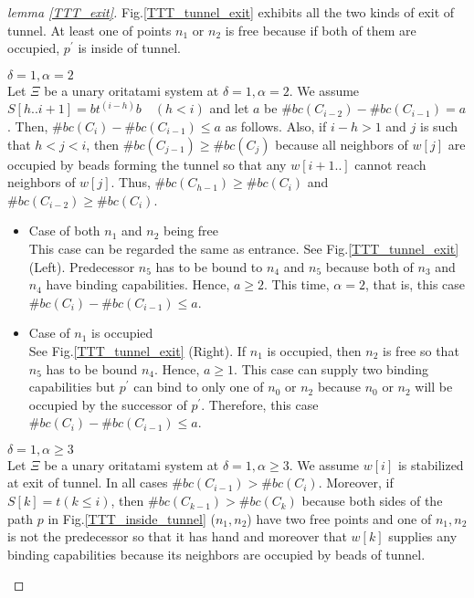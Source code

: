 \documentclass[runningheads]{llncs}
\begin{document}
\begin{proof}[lemma \ref{TTT_exit}]
Fig.\ref{TTT_tunnel_exit} exhibits all the two kinds of exit of tunnel. 
At least one of points $n_1$ or $n_2$ is free because if both of them are occupied, $p^\prime$ is inside of tunnel.

\begin{paragraph}{}
$\delta = 1, \alpha = 2$\\
Let $\Xi$ be a unary oritatami system at $\delta = 1, \alpha = 2$. We assume $S[h..i+1] = bt^{(i-h)}b \quad (h<i)$ and
let $a$ be $\#bc(C_{i-2}) - \#bc(C_{i-1}) = a$. Then, $\#bc(C_{i}) - \#bc(C_{i-1}) \leq a$ as follows. Also, if $i - h > 1$ and $j$ is such that $h<j<i$, then $\#bc(C_{j-1}) \geq \#bc(C_{j})$ because all neighbors of $w[j]$ are occupied by beads forming the tunnel so that any $w[i+1..]$ cannot reach neighbors of $w[j]$. Thus, $\#bc(C_{h-1}) \geq \#bc(C_i)$ and $\#bc(C_{i-2}) \geq \#bc(C_i)$.
\end{paragraph}

\begin{itemize}
\item{Case of both $n_1$ and $n_2$ being free}\\
  This case can be regarded the same as entrance. See Fig.\ref{TTT_tunnel_exit} (Left). Predecessor $n_5$ has to be bound to $n_4$ and $n_5$ because both of $n_3$ and $n_4$ have binding capabilities. Hence, $a \geq 2$. This time, $\alpha = 2$, that is, this case $\#bc(C_{i}) - \#bc(C_{i-1}) \leq a$.
  
\item{Case of $n_1$ is occupied}\\
  See Fig.\ref{TTT_tunnel_exit} (Right). If $n_1$ is occupied, then $n_2$ is free so that $n_5$ has to be bound $n_4$. Hence,  $a \geq 1$. This case can supply two binding capabilities but $p^\prime$ can bind to only one of $n_0$ or $n_2$ because $n_0$ or $n_2$ will be occupied by the successor of $p^\prime$. Therefore, this case $\#bc(C_{i}) - \#bc(C_{i-1}) \leq a$.
  
\end{itemize}

\begin{paragraph}{}
$\delta = 1, \alpha \geq 3$\\
Let $\Xi$ be a unary oritatami system at $\delta = 1, \alpha \geq 3$. We assume $w[i]$ is stabilized at exit of tunnel.
In all cases $\#bc(C_{i-1}) > \#bc(C_{i})$. Moreover, if $S[k] = t (k \leq i)$, then $\#bc(C_{k-1}) > \#bc(C_{k})$ because both sides of the path $p$ in Fig.\ref{TTT_inside_tunnel} ($n_1, n_2$) have two free points and one of $n_1, n_2$ is not the predecessor so that it has hand and moreover that $w[k]$ supplies any binding capabilities because its neighbors are occupied by beads of tunnel.
\end{paragraph}


\end{proof}
\end{document}
